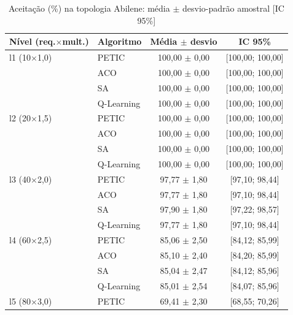 \begin{table}[htb]
    \centering
    \small
    \caption{Aceitação (\%) na topologia Abilene: média $\pm$ desvio-padrão amostral [IC 95\%]}
    \label{tab:aceitacao-abilene}
    \begin{tabular}{llcc}
        \hline
        Nível (req.$\times$mult.) & Algoritmo & Média $\pm$ desvio & IC 95\% \\
        \hline
        l1 (10$\times$1,0) & PETIC & 100,00 $\pm$ 0,00 & [100,00; 100,00] \\
         & ACO & 100,00 $\pm$ 0,00 & [100,00; 100,00] \\
         & SA & 100,00 $\pm$ 0,00 & [100,00; 100,00] \\
         & Q-Learning & 100,00 $\pm$ 0,00 & [100,00; 100,00] \\
        \hline
        l2 (20$\times$1,5) & PETIC & 100,00 $\pm$ 0,00 & [100,00; 100,00] \\
         & ACO & 100,00 $\pm$ 0,00 & [100,00; 100,00] \\
         & SA & 100,00 $\pm$ 0,00 & [100,00; 100,00] \\
         & Q-Learning & 100,00 $\pm$ 0,00 & [100,00; 100,00] \\
        \hline
        l3 (40$\times$2,0) & PETIC & 97,77 $\pm$ 1,80 & [97,10; 98,44] \\
         & ACO & 97,77 $\pm$ 1,80 & [97,10; 98,44] \\
         & SA & 97,90 $\pm$ 1,80 & [97,22; 98,57] \\
         & Q-Learning & 97,77 $\pm$ 1,80 & [97,10; 98,44] \\
        \hline
        l4 (60$\times$2,5) & PETIC & 85,06 $\pm$ 2,50 & [84,12; 85,99] \\
         & ACO & 85,10 $\pm$ 2,40 & [84,20; 85,99] \\
         & SA & 85,04 $\pm$ 2,47 & [84,12; 85,96] \\
         & Q-Learning & 85,01 $\pm$ 2,54 & [84,07; 85,96] \\
        \hline
        l5 (80$\times$3,0) & PETIC & 69,41 $\pm$ 2,30 & [68,55; 70,26] \\

\end{tabular}
\end{table}
